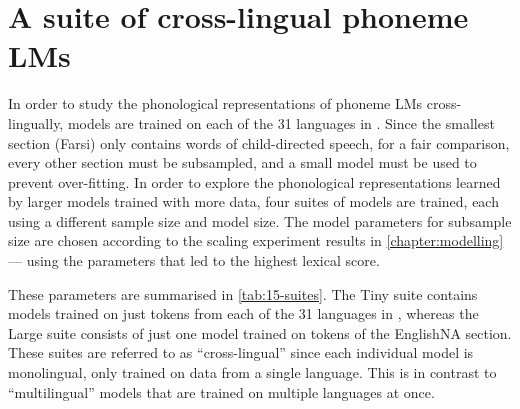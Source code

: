 


\section{A suite of cross-lingual phoneme LMs}\label{sec:15-suite}

In order to study the phonological representations of phoneme LMs cross-lingually, \gpt models are trained on each of the 31 languages in \ipachildes. Since the smallest section (Farsi) only contains  words of child-directed speech, for a fair comparison, every other section must be subsampled, and a small model must be used to prevent over-fitting. In order to explore the phonological representations learned by larger models trained with more data, four suites of models are trained, each using a different sample size and model size. The model parameters for subsample size are chosen according to the scaling experiment results in \cref{chapter:modelling} --- using the parameters that led to the highest \babyslm lexical score.

These parameters are summarised in \cref{tab:15-suites}. The Tiny suite contains models trained on just  tokens from each of the 31 languages in \ipachildes, whereas the Large suite consists of just one model trained on  tokens of the EnglishNA section. These suites are referred to as ``cross-lingual'' since each individual model is monolingual, only trained on data from a single language. This is in contrast to ``multilingual'' models that are trained on multiple languages at once.

